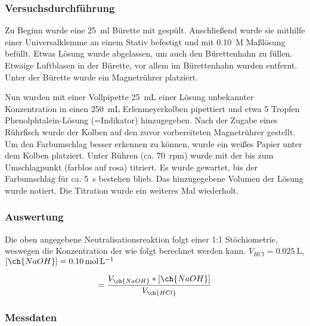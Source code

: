 \documentclass{article}
\begin{document}
      \subsubsection{Versuchsdurchführung} \label{sec:VersuchSalz}
        
        Zu Beginn wurde eine \SI[mode=text,separate-uncertainty=true]{25}{\milli\litre} Bürette mit  gespült. Anschließend wurde sie mithilfe einer Universalklemme an einem Stativ befestigt und mit \SI[mode=text]{0.10}{M}  Maßlösung befüllt. Etwas Lösung wurde abgelassen, um auch den Bürettenhahn zu füllen. Etwaige Luftblasen in der Bürette, vor allem im Bürettenhahn wurden entfernt. Unter der Bürette wurde ein Magnetrührer platziert. 
        
        Nun wurden mit einer Vollpipette \SI[mode=text]{25}{\milli\liter} einer  Lösung unbekannter Konzentration in einen \SI[mode=text]{250}{\milli\liter} Erlenmeyerkolben pipettiert und etwa 5 Tropfen Phenolphtalein-Lösung (=Indikator) hinzugegeben. Nach der Zugabe eines Rührfisch wurde der Kolben auf den zuvor vorbereiteten Magnetrührer gestellt. Um den Farbumschlag besser erkennen zu können, wurde ein weißes Papier unter dem Kolben platziert.  Unter Rühren (ca. \SI[mode=text]{70}{rpm}) wurde mit der  bis zum Umschlagpunkt (farblos auf rosa) titriert. Es wurde gewartet, bis der Farbumschlag für ca. \SI[mode=text]{5}{\second} bestehen blieb. Das hinzugegebene Volumen der  Lösung wurde notiert. Die Titration wurde ein weiteres Mal wiederholt. 
      
      \pagebreak
      
      \subsubsection{Auswertung}
        
         Die oben angegebene Neutralisationsreaktion folgt einer 1:1 Stöchiometrie, weswegen die Konzentration der  wie folgt berechnet werden kann. $V_{HCl} = \SI[mode=text]{0.025}{\liter}$, $[\ch{NaOH}] = \SI[mode=text]{0.10}{\mole\per\liter}$
         
         \begin{equation}
           [\ch{HCl}] = \frac{V_{\ch{NaOH}} * [\ch{NaOH}]}{V_{\ch{HCl}}} \label{eq:Hcl}
         \end{equation}
        
      \subsubsection{Messdaten}
        
\end{document}
